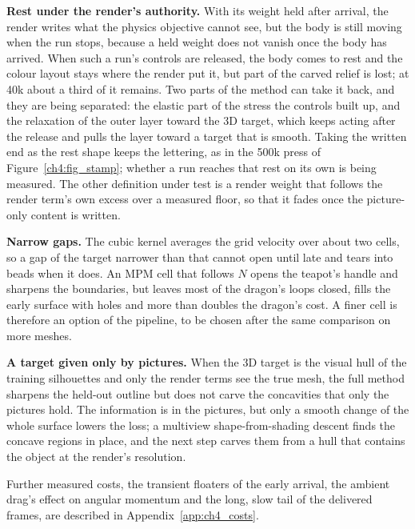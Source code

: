 \textbf{Rest under the render's authority.} With its weight held after arrival, the render writes what the physics
objective cannot see, but the body is still moving when the run stops, because a held weight does not vanish once the
body has arrived. When such a run's controls are released, the body comes to rest and the colour layout stays where the
render put it, but part of the carved relief is lost; at 40k about a third of it remains. Two parts of the method can take
it back, and they are being separated: the elastic part of the stress the controls built up, and the relaxation of the
outer layer toward the 3D target, which keeps acting after the release and pulls the layer toward a target that is smooth. Taking the written end as the rest shape keeps the lettering, as in the 500k press of
Figure~\ref{ch4:fig_stamp}; whether a run reaches that rest on its own is being measured. The other definition under test
is a render weight that follows the render term's own excess over a measured floor, so that it fades once the
picture-only content is written.

\textbf{Narrow gaps.} The cubic kernel averages the grid velocity over about two cells, so a gap of the target narrower
than that cannot open until late and tears into beads when it does. An MPM cell that follows $N$ opens the teapot's handle
and sharpens the boundaries, but leaves most of the dragon's loops closed, fills the early surface with holes and more
than doubles the dragon's cost. A finer cell is therefore an option of the pipeline, to be chosen after the same comparison
on more meshes.

\textbf{A target given only by pictures.} When the 3D target is the visual hull of the training silhouettes and only the
render terms see the true mesh, the full method sharpens the held-out outline but does not carve the concavities that only
the pictures hold. The information is in the pictures, but only a smooth change of the whole surface lowers the loss; a
multiview shape-from-shading descent finds the concave regions in place, and the next step carves them from a hull that
contains the object at the render's resolution.


Further measured costs, the transient floaters of the early arrival, the ambient drag's effect on angular momentum and the
long, slow tail of the delivered frames, are described in Appendix~\ref{app:ch4_costs}.

